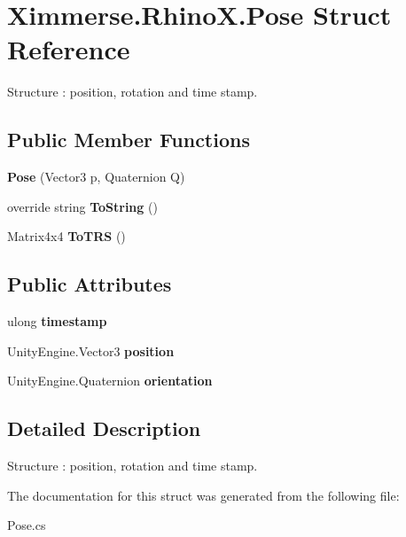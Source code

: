 \hypertarget{struct_ximmerse_1_1_rhino_x_1_1_pose}{}\section{Ximmerse.\+Rhino\+X.\+Pose Struct Reference}
\label{struct_ximmerse_1_1_rhino_x_1_1_pose}


Structure \+: position, rotation and time stamp.  


\subsection*{Public Member Functions}
\begin{DoxyCompactItemize}
\item 
\mbox{\label{struct_ximmerse_1_1_rhino_x_1_1_pose_ad4410498d9dc1bb199825c3d7c1e6dec}} 
{\bfseries Pose} (Vector3 p, Quaternion Q)
\item 
\mbox{\label{struct_ximmerse_1_1_rhino_x_1_1_pose_ac17c62b044b130e771bde4aa80858dd9}} 
override string {\bfseries To\+String} ()
\item 
\mbox{\label{struct_ximmerse_1_1_rhino_x_1_1_pose_a4ad7225d77ceab169e28a4f89cd0abab}} 
Matrix4x4 {\bfseries To\+T\+RS} ()
\end{DoxyCompactItemize}
\subsection*{Public Attributes}
\begin{DoxyCompactItemize}
\item 
\mbox{\label{struct_ximmerse_1_1_rhino_x_1_1_pose_a74423dd5b285bcc1aed9f46e1cfd9ce4}} 
ulong {\bfseries timestamp}
\item 
\mbox{\label{struct_ximmerse_1_1_rhino_x_1_1_pose_a6b7f64762a834a1c15c8756da809360d}} 
Unity\+Engine.\+Vector3 {\bfseries position}
\item 
\mbox{\label{struct_ximmerse_1_1_rhino_x_1_1_pose_a8c23fa1f5d40da1532633cba2be209d3}} 
Unity\+Engine.\+Quaternion {\bfseries orientation}
\end{DoxyCompactItemize}


\subsection{Detailed Description}
Structure \+: position, rotation and time stamp. 



The documentation for this struct was generated from the following file\+:\begin{DoxyCompactItemize}
\item 
Pose.\+cs\end{DoxyCompactItemize}
